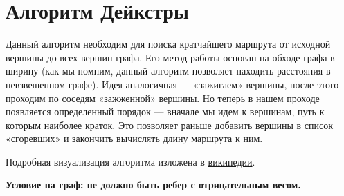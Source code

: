 \documentclass[a4paper,12pt]{article}
\theoremstyle{plain} %
\theoremstyle{definition} %
\theoremstyle{remark} %
\begin{document}
\section{Алгоритм Дейкстры}
Данный алгоритм необходим для поиска кратчайшего маршрута от исходной вершины до всех вершин графа. Его метод работы основан на обходе графа в ширину (как мы помним, данный алгоритм позволяет находить расстояния в невзвешенном графе). Идея аналогичная --- «зажигаем» вершины, после этого проходим по соседям «зажженной» вершины. Но теперь в нашем проходе появляется определенный порядок --- вначале мы идем к вершинам, путь к которым наиболее краток. Это позволяет раньше добавить вершины в список «сгоревших» и закончить вычислять длину маршрута к ним.

Подробная визуализация алгоритма изложена в \href{https://ru.wikipedia.org/wiki/%D0%90%D0%BB%D0%B3%D0%BE%D1%80%D0%B8%D1%82%D0%BC_%D0%94%D0%B5%D0%B9%D0%BA%D1%81%D1%82%D1%80%D1%8B#.D0.9D.D0.B5.D1.84.D0.BE.D1.80.D0.BC.D0.B0.D0.BB.D1.8C.D0.BD.D0.BE.D0.B5_.D0.BE.D0.B1.D1.8A.D1.8F.D1.81.D0.BD.D0.B5.D0.BD.D0.B8.D0.B5}{википедии}.

\textbf{Условие на граф: не должно быть ребер с отрицательным весом.}
\end{document}
